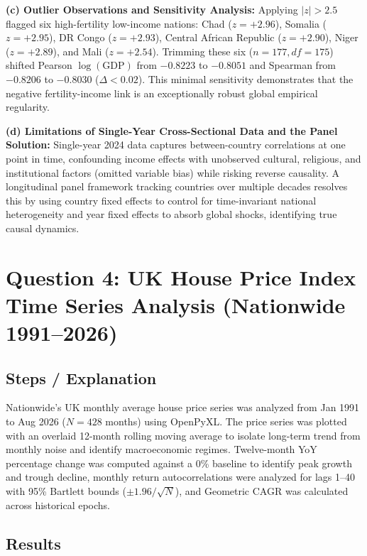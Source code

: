 \documentclass[11pt,a4paper]{article}
\begin{document}
\textbf{(c) Outlier Observations and Sensitivity Analysis:} Applying $|z| > 2.5$ flagged six high-fertility low-income nations: Chad ($z = +2.96$), Somalia ($z = +2.95$), DR Congo ($z = +2.93$), Central African Republic ($z = +2.90$), Niger ($z = +2.89$), and Mali ($z = +2.54$). Trimming these six ($n = 177, df = 175$) shifted Pearson $\log(\text{GDP})$ from $-0.8223$ to $-0.8051$ and Spearman from $-0.8206$ to $-0.8030$ ($\Delta < 0.02$). This minimal sensitivity demonstrates that the negative fertility-income link is an exceptionally robust global empirical regularity.

\textbf{(d) Limitations of Single-Year Cross-Sectional Data and the Panel Solution:} Single-year 2024 data captures between-country correlations at one point in time, confounding income effects with unobserved cultural, religious, and institutional factors (omitted variable bias) while risking reverse causality. A longitudinal panel framework tracking countries over multiple decades resolves this by using country fixed effects to control for time-invariant national heterogeneity and year fixed effects to absorb global shocks, identifying true causal dynamics.

\newpage
\section*{Question 4: UK House Price Index Time Series Analysis (Nationwide 1991–2026)}

\subsection*{Steps / Explanation}
Nationwide's UK monthly average house price series was analyzed from Jan 1991 to Aug 2026 ($N = 428$ months) using OpenPyXL. The price series was plotted with an overlaid 12-month rolling moving average to isolate long-term trend from monthly noise and identify macroeconomic regimes. Twelve-month YoY percentage change was computed against a 0\% baseline to identify peak growth and trough decline, monthly return autocorrelations were analyzed for lags 1--40 with 95\% Bartlett bounds ($\pm 1.96 / \sqrt{N}$), and Geometric CAGR was calculated across historical epochs.

\subsection*{Results}
\end{document}
